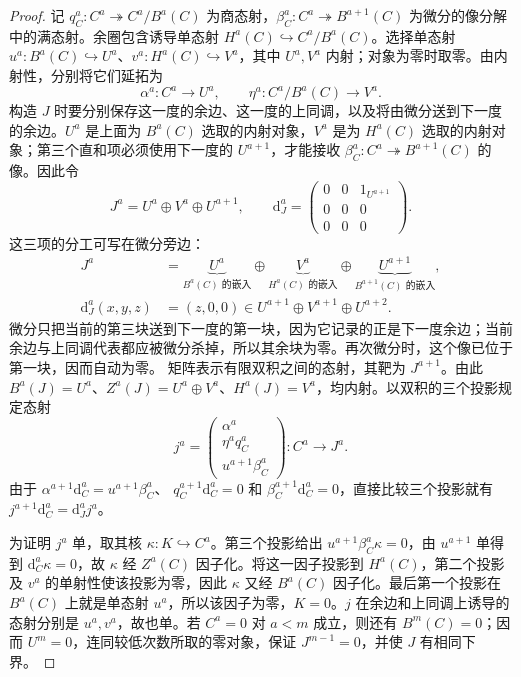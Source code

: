 \begin{proof}
	记 \(q_C^a:C^a\twoheadrightarrow C^a/B^a(C)\) 为商态射，\(\beta_C^a:C^a\twoheadrightarrow B^{a+1}(C)\) 为微分的像分解中的满态射。余圈包含诱导单态射 \(H^a(C)\hookrightarrow C^a/B^a(C)\)。选择单态射 \(u^a:B^a(C)\hookrightarrow U^a\)、\(v^a:H^a(C)\hookrightarrow V^a\)，其中 \(U^a,V^a\) 内射；对象为零时取零。由内射性，分别将它们延拓为
	\[
		\alpha^a:C^a\longrightarrow U^a,\qquad \eta^a:C^a/B^a(C)\longrightarrow V^a.
	\]
	构造 \(J\) 时要分别保存这一度的余边、这一度的上同调，以及将由微分送到下一度的余边。\(U^a\) 是上面为 \(B^a(C)\) 选取的内射对象，\(V^a\) 是为 \(H^a(C)\) 选取的内射对象；第三个直和项必须使用下一度的 \(U^{a+1}\)，才能接收 \(\beta_C^a:C^a\twoheadrightarrow B^{a+1}(C)\) 的像。因此令
	\[
		J^a=U^a\oplus V^a\oplus U^{a+1},\qquad \mathrm{d}_J^a=
		\begin{pmatrix}
			0&0&1_{U^{a+1}}\\0&0&0\\0&0&0
		\end{pmatrix}.
	\]
	这三项的分工可写在微分旁边：
	\[
		\begin{aligned}
			J^a&=\underbrace{U^a}_{B^a(C)\text{ 的嵌入}} \oplus\underbrace{V^a}_{H^a(C)\text{ 的嵌入}} \oplus\underbrace{U^{a+1}}_{B^{a+1}(C)\text{ 的嵌入}},\\
			\mathrm{d}_J^a(x,y,z)&=(z,0,0) \in U^{a+1}\oplus V^{a+1}\oplus U^{a+2}.
		\end{aligned}
	\]
	微分只把当前的第三块送到下一度的第一块，因为它记录的正是下一度余边；当前余边与上同调代表都应被微分杀掉，所以其余块为零。再次微分时，这个像已位于第一块，因而自动为零。 矩阵表示有限双积之间的态射，其靶为 \(J^{a+1}\)。由此 \(B^a(J)=U^a\)、\(Z^a(J)=U^a\oplus V^a\)、\(H^a(J)=V^a\)，均内射。以双积的三个投影规定态射
	\[
		j^a=\begin{pmatrix}
			\alpha^a\\ \eta^a q_C^a\\ u^{a+1}\beta_C^a
		\end{pmatrix}:C^a\longrightarrow J^a.
	\]
	由于 \(\alpha^{a+1}\mathrm{d}_C^a=u^{a+1}\beta_C^a\)、 \(q_C^{a+1}\mathrm{d}_C^a=0\) 和 \(\beta_C^{a+1}\mathrm{d}_C^a=0\)，直接比较三个投影就有 \(j^{a+1}\mathrm{d}_C^a=\mathrm{d}_J^a j^a\)。

	为证明 \(j^a\) 单，取其核 \(\kappa:K\hookrightarrow C^a\)。第三个投影给出 \(u^{a+1}\beta_C^a\kappa=0\)，由 \(u^{a+1}\) 单得到 \(\mathrm{d}_C^a\kappa=0\)，故 \(\kappa\) 经 \(Z^a(C)\) 因子化。将这一因子投影到 \(H^a(C)\)，第二个投影及 \(v^a\) 的单射性使该投影为零，因此 \(\kappa\) 又经 \(B^a(C)\) 因子化。最后第一个投影在 \(B^a(C)\) 上就是单态射 \(u^a\)，所以该因子为零，\(K=0\)。\(j\) 在余边和上同调上诱导的态射分别是 \(u^a,v^a\)，故也单。若 \(C^a=0\) 对 \(a<m\) 成立，则还有 \(B^m(C)=0\)；因而 \(U^m=0\)，连同较低次数所取的零对象，保证 \(J^{m-1}=0\)，并使 \(J\) 有相同下界。


\end{proof}

